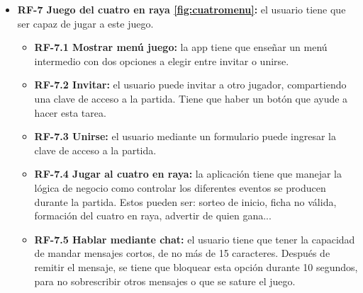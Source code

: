 \begin{itemize}
	\item \textbf{RF-7 Juego del cuatro en raya \ref{fig:cuatromenu}:} el usuario tiene que ser capaz de jugar a este juego.
	
	\begin{itemize}
		\tightlist
		\item \textbf{RF-7.1 Mostrar menú juego:} la app tiene que enseñar un menú intermedio con dos opciones a elegir entre invitar o unirse.
		\item \textbf{RF-7.2 Invitar:} el usuario puede invitar a otro jugador, compartiendo una clave de acceso a la partida. Tiene que haber un botón que ayude a hacer esta tarea.
		\item \textbf{RF-7.3 Unirse:} el usuario mediante un formulario puede ingresar la clave de acceso a la partida.
		\item \textbf{RF-7.4 Jugar al cuatro en raya:} la aplicación tiene que manejar la lógica de negocio como controlar los diferentes eventos se producen durante la partida. Estos pueden ser: sorteo de inicio, ficha no válida, formación del cuatro en raya, advertir de quien gana...
		\item \textbf{RF-7.5 Hablar mediante chat:} el usuario tiene que tener la capacidad de mandar mensajes cortos, de no más de 15 caracteres. Después de remitir el mensaje, se tiene que bloquear esta opción durante 10 segundos, para no sobrescribir otros mensajes o que se sature el juego.
	\end{itemize}

\end{itemize}


